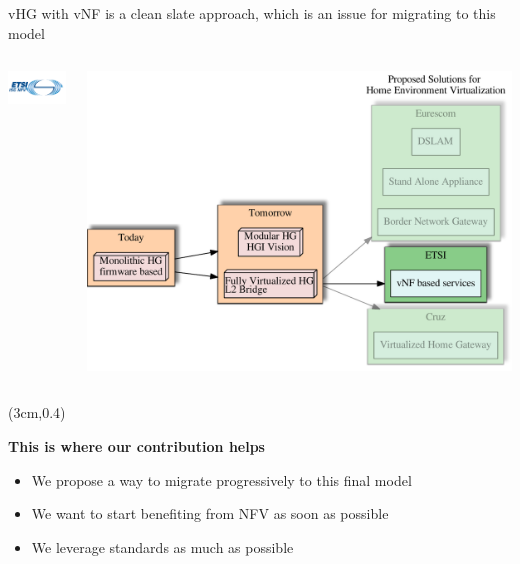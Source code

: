 \documentclass[a4paper]{beamer}
\begin{document}
\begin{frame}{vHG with vNF is a clean slate approach, which is an issue for migrating to this model}
	\begin{columns}[T]
		\begin{column}[T]{0.33 \textwidth} 
			\vspace{6em}
			\includegraphics[width=10em]{etsinfv.png}
		\end{column}
										
		\begin{column}[T]{0.66\textwidth} 
										   
			\includegraphics[width=\textwidth]{vhgtrends-etsi-emphasis.pdf}
																																						
		\end{column}
																										
	\end{columns}
	\begin{textblock*}{8cm}(3cm,0.4\textheight)
		\begin{block}{}
			\textbf{ This is where our contribution helps }
			\begin{itemize}
				\item We propose a way to migrate progressively to this final model
				\item We want to start benefiting from NFV as soon as possible
				\item We leverage standards as much as possible
			\end{itemize}
		\end{block}
	\end{textblock*}		
\end{frame}
\end{document}
